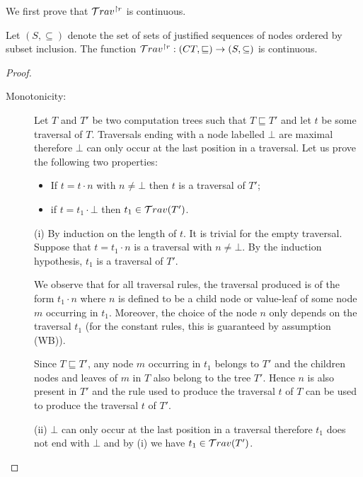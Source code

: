 We first prove that $\mathcal{T}rav^{\upharpoonright r}$ is continuous.
\begin{lem}
\label{lem:travred_continuous} Let $(S,\subseteq)$ denote the set of
sets of justified sequences of nodes ordered by subset inclusion.
The function $\mathcal{T}rav^{\upharpoonright r} : (CT,\sqsubseteq)
\rightarrow (S,\subseteq)$ is continuous.
\end{lem}
\begin{proof} \
    \begin{description}
    \item[Monotonicity:] Let $T$ and $T'$ be two computation trees such that $T \sqsubseteq T'$
    and let $t$ be some traversal of $T$.
    Traversals ending with a node labelled $\bot$ are maximal therefore $\bot$ can only occur
    at the last position in a traversal. Let us prove the following two properties:
        \begin{itemize}
            \item[(i)]  If $t = t \cdot n$ with $n\neq \bot$ then $t$ is a traversal of $T'$;
            \item[(ii)] if $t= t_1 \cdot \bot$ then $t_1\in \mathcal{T}rav(T')$.
        \end{itemize}

        (i) By induction on the length of $t$. It is trivial for the empty traversal.
            Suppose that $t = t_1 \cdot n$ is a traversal with $n \neq \bot$.
            By the induction hypothesis, $t_1$ is a traversal of $T'$.

            We observe that for all traversal rules, the traversal produced is of the form $t_1 \cdot n$ where
            $n$ is defined to be a child node or value-leaf of some node $m$ occurring in $t_1$.
            Moreover, the choice of the node $n$ only depends on the traversal $t_1$
            (for the constant rules, this is guaranteed by assumption (WB)).

            Since $T \sqsubseteq T'$, any node $m$ occurring in $t_1$ belongs
            to $T'$ and the children nodes and leaves of $m$ in $T$ also belong to the tree $T'$.
            Hence $n$ is also present in $T'$ and the rule used to produce the traversal $t$ of $T$
            can be used to produce the traversal $t$ of $T'$.

        (ii) $\bot$ can only occur at the last position in a traversal
        therefore $t_1$ does not end with $\bot$ and by (i) we have $t_1\in \mathcal{T}rav(T')$.
\vspace{6pt}


\end{description}
\end{proof}
